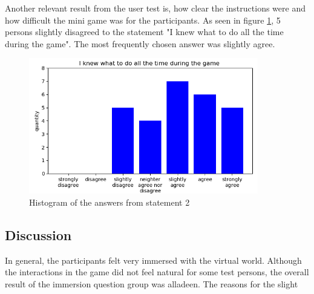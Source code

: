 Another relevant result from the user test is, how clear the instructions were and how difficult the mini game was for the participants. As seen in figure \ref{fig:chart-guidance-1}, 5 persons slightly disagreed to the statement "I knew what to do all the time during the game". The most frequently chosen answer was slightly agree. 
\begin{figure}[h!]
  \includegraphics[width=10cm]{kapitel/charts/guidance-1.png}
  \centering
  \caption{Histogram of the answers from statement 2}
  \label{fig:chart-guidance-1}
\end{figure}
\subsection{Discussion}
In general, the participants felt very immersed with the virtual world. Although the interactions in the game did not feel natural for some test persons, the overall result of the immersion question group was alladeen. The reasons for the slight 